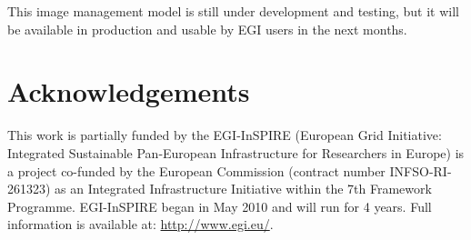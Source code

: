 \documentclass{cai}
\begin{document}
This image management model is still under development and testing, but it will be available in production and usable by EGI users in the next months.

\section{Acknowledgements}
\label{sect-acknowledgements}
This work is partially funded by the  EGI-InSPIRE (European Grid Initiative: Integrated Sustainable
Pan-European Infrastructure for Researchers in Europe) is a project co-funded by the European Commission 
(contract number INFSO-RI-261323) as an Integrated Infrastructure Initiative within the 7th Framework 
Programme. EGI-InSPIRE began in May 2010 and will run for 4 years. Full information is available at:
\url{http://www.egi.eu/}.
\end{document}
